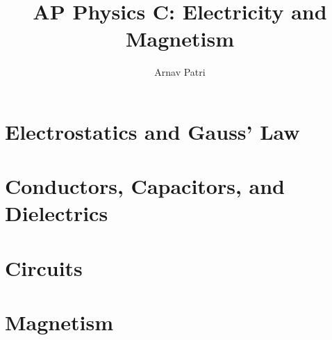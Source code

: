 \documentclass[A4, 12pt]{report}
\title{AP Physics C: Electricity and Magnetism}
\author{Arnav Patri}
\begin{document}
	\maketitle
	\chapter{Electrostatics and Gauss' Law}
		
	\chapter{Conductors, Capacitors, and Dielectrics}
		
	\chapter{Circuits}
		
	\chapter{Magnetism}
		
\end{document}
